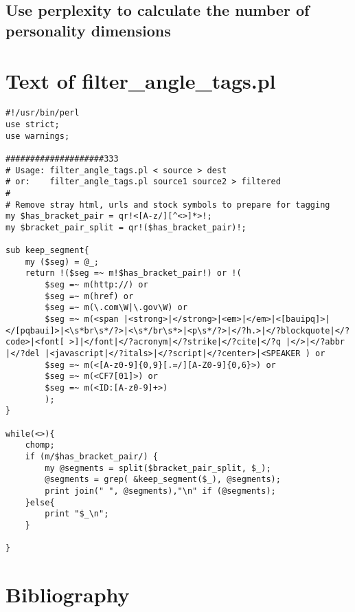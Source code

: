 \documentclass[10pt,letterpaper]{book}
\begin{document}
\section{Use perplexity to calculate the number of personality dimensions}

\appendix
\chapter{Text of filter\_angle\_tags.pl}
\label{app:filterangletags}

\lstset{language=Perl}
\begin{lstlisting}
#!/usr/bin/perl
use strict;
use warnings;

####################333
# Usage: filter_angle_tags.pl < source > dest
# or:    filter_angle_tags.pl source1 source2 > filtered
#
# Remove stray html, urls and stock symbols to prepare for tagging
my $has_bracket_pair = qr!<[A-z/][^<>]*>!;
my $bracket_pair_split = qr!($has_bracket_pair)!;

sub keep_segment{
    my ($seg) = @_;
    return !($seg =~ m!$has_bracket_pair!) or !(
        $seg =~ m(http://) or
        $seg =~ m(href) or
        $seg =~ m(\.com\W|\.gov\W) or
        $seg =~ m(<span |<strong>|</strong>|<em>|</em>|<[bauipq]>|</[pqbaui]>|<\s*br\s*/?>|<\s*/br\s*>|<p\s*/?>|</?h.>|</?blockquote|</?code>|<font[ >]|</font|</?acronym|</?strike|</?cite|</?q |</>|</?abbr |</?del |<javascript|</?itals>|</?script|</?center>|<SPEAKER ) or
        $seg =~ m(<[A-z0-9]{0,9}[.=/][A-Z0-9]{0,6}>) or
        $seg =~ m(<CF7[01]>) or
        $seg =~ m(<ID:[A-z0-9]+>)
        );
}

while(<>){
    chomp;
    if (m/$has_bracket_pair/) {
        my @segments = split($bracket_pair_split, $_);
        @segments = grep( &keep_segment($_), @segments);
        print join(" ", @segments),"\n" if (@segments);
    }else{
        print "$_\n";
    }

}
\end{lstlisting}



\chapter{Bibliography}


\end{document}
